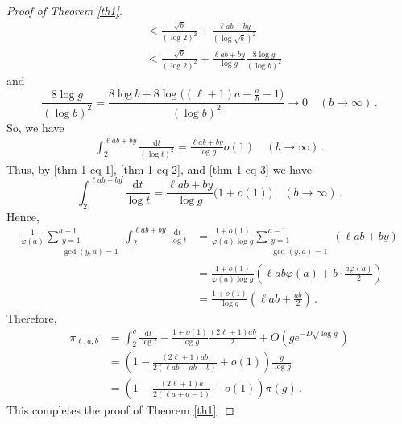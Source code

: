 \documentclass[12pt,a4paper,reqno]{amsart}
\numberwithin{equation}{section}
\def\d{{\mathrm{d}}}
\theoremstyle{plain}
\theoremstyle{definition}
\begin{document}
\begin{proof}[Proof of Theorem \ref{th1}]
\begin{align*}
 		&<\frac{\sqrt{b}}{(\log 2)^{2}}+\frac{\ell a b+b y}{(\log \sqrt{b})^{2}}\\
 		&<\frac{\sqrt{b}}{(\log 2)^{2}}+\frac{\ell ab+by}{\log g}\frac{8\log g}{(\log b)^{2}}
 	\end{align*} 
 	and 
 	$$
 	\frac{ 8  \log g}{(\log b)^{2}}=\frac{8\log b + 8\log \big((\ell+1)a-\frac{a}{b}-1\big)}{(\log b)^{2}}\to 0\quad(b\to\infty)\,. 
 	$$ 
 	So, we have 
 	\begin{align}\label{thm-1-eq-3}
 		\int_2^{\ell a b+b y}\frac{\d t}{(\log t)^{2}} = \frac{\ell ab+by}{\log g}o(1) \quad (b\to \infty)\,.
 	\end{align}
 	Thus, by \eqref{thm-1-eq-1}, \eqref{thm-1-eq-2}, and \eqref{thm-1-eq-3} we have
 	$$
 	\int_2^{\ell a b+b y}\frac{\d t}{\log t}=\frac{\ell a b+b y}{\log g}\bigl(1+o(1)\bigr)\quad(b\to\infty)\,. 
 	$$ 
 	Hence, 
 	\begin{align*}
 		\frac{1}{\varphi(a)}\sum_{\substack{y=1\\\gcd(y,a)=1}}^{a-1}\int_2^{\ell a b+b y}\frac{\d t}{\log t}
 		&=\frac{1+o(1)}{\varphi(a)\log g}\sum_{\substack{y=1\\\gcd(y,a)=1}}^{a-1}(\ell a b+b y)\\
 		&=\frac{1+o(1)}{\varphi(a)\log g}\left(\ell a b\varphi(a)+b\cdot\frac{a\varphi(a)}{2}\right)\\
 		&=\frac{1+o(1)}{\log g}\left(\ell a b+\frac{a b}{2}\right)\,. 
 	\end{align*} 
 	Therefore,  
 	\begin{align*}
 		\pi_{\ell,a,b}&=\int_2^{g}\frac{\d t}{\log t}-\frac{1+o(1)}{\log g}\frac{(2\ell+1)a b}{2}+O(g e^{-D\sqrt{\log g}})\\
 		&=\left(1-\frac{(2\ell+1)a b}{2(\ell a b+a b-b)}+o(1)\right)\frac{g}{\log g}\\
 		&=\left(1-\frac{(2\ell+1)a}{2(\ell a+a-1)} + o(1)  \right)\pi(g)\,. 
 	\end{align*} 
 	This completes the proof of Theorem \ref{th1}.
 \end{proof}
 
\end{document}
